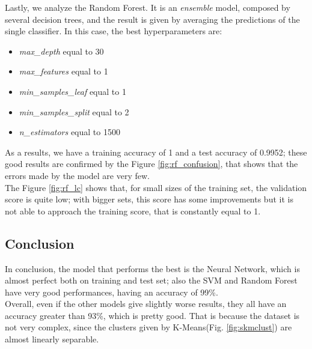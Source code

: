 Lastly, we analyze the Random Forest. It is an \emph{ensemble} model, composed by several decision trees, and the result is given by averaging the predictions of the single classifier.
In this case, the best hyperparameters are:
\begin{itemize}
\item \emph{max\_depth} equal to 30
\item \emph{max\_features} equal to 1
\item \emph{min\_samples\_leaf} equal to 1
\item \emph{min\_samples\_split} equal to 2
\item \emph{n\_estimators} equal to 1500
\end{itemize}
As a results, we have a training accuracy of 1 and a test accuracy of 0.9952; these good results are confirmed by the Figure \ref{fig:rf_confusion}, that shows that the errors made by the model are very few.\\
The Figure \ref{fig:rf_lc} shows that, for small sizes of the training set, the validation score is quite low; with bigger sets, this score has some improvements but it is not able to approach the training score, that is constantly equal to 1.

\subsection{Conclusion}
In conclusion, the model that performs the best is the Neural Network, which is almost perfect both on training and test set; also the SVM and Random Forest have very good performances, having an accuracy of 99\%.\\
Overall, even if the other models give slightly worse results, they all have an accuracy greater than 93\%, which is pretty good. That is because the dataset is not very complex, since the clusters given by K-Means(Fig. \ref{fig:skmclust}) are almost linearly separable.
